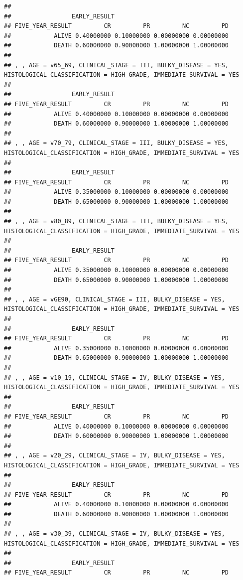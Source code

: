 \documentclass[]{article}
\begin{document}
\begin{verbatim}
## 
##                 EARLY_RESULT
## FIVE_YEAR_RESULT         CR         PR         NC         PD
##            ALIVE 0.40000000 0.10000000 0.00000000 0.00000000
##            DEATH 0.60000000 0.90000000 1.00000000 1.00000000
## 
## , , AGE = v65_69, CLINICAL_STAGE = III, BULKY_DISEASE = YES, HISTOLOGICAL_CLASSIFICATION = HIGH_GRADE, IMMEDIATE_SURVIVAL = YES
## 
##                 EARLY_RESULT
## FIVE_YEAR_RESULT         CR         PR         NC         PD
##            ALIVE 0.40000000 0.10000000 0.00000000 0.00000000
##            DEATH 0.60000000 0.90000000 1.00000000 1.00000000
## 
## , , AGE = v70_79, CLINICAL_STAGE = III, BULKY_DISEASE = YES, HISTOLOGICAL_CLASSIFICATION = HIGH_GRADE, IMMEDIATE_SURVIVAL = YES
## 
##                 EARLY_RESULT
## FIVE_YEAR_RESULT         CR         PR         NC         PD
##            ALIVE 0.35000000 0.10000000 0.00000000 0.00000000
##            DEATH 0.65000000 0.90000000 1.00000000 1.00000000
## 
## , , AGE = v80_89, CLINICAL_STAGE = III, BULKY_DISEASE = YES, HISTOLOGICAL_CLASSIFICATION = HIGH_GRADE, IMMEDIATE_SURVIVAL = YES
## 
##                 EARLY_RESULT
## FIVE_YEAR_RESULT         CR         PR         NC         PD
##            ALIVE 0.35000000 0.10000000 0.00000000 0.00000000
##            DEATH 0.65000000 0.90000000 1.00000000 1.00000000
## 
## , , AGE = vGE90, CLINICAL_STAGE = III, BULKY_DISEASE = YES, HISTOLOGICAL_CLASSIFICATION = HIGH_GRADE, IMMEDIATE_SURVIVAL = YES
## 
##                 EARLY_RESULT
## FIVE_YEAR_RESULT         CR         PR         NC         PD
##            ALIVE 0.35000000 0.10000000 0.00000000 0.00000000
##            DEATH 0.65000000 0.90000000 1.00000000 1.00000000
## 
## , , AGE = v10_19, CLINICAL_STAGE = IV, BULKY_DISEASE = YES, HISTOLOGICAL_CLASSIFICATION = HIGH_GRADE, IMMEDIATE_SURVIVAL = YES
## 
##                 EARLY_RESULT
## FIVE_YEAR_RESULT         CR         PR         NC         PD
##            ALIVE 0.40000000 0.10000000 0.00000000 0.00000000
##            DEATH 0.60000000 0.90000000 1.00000000 1.00000000
## 
## , , AGE = v20_29, CLINICAL_STAGE = IV, BULKY_DISEASE = YES, HISTOLOGICAL_CLASSIFICATION = HIGH_GRADE, IMMEDIATE_SURVIVAL = YES
## 
##                 EARLY_RESULT
## FIVE_YEAR_RESULT         CR         PR         NC         PD
##            ALIVE 0.40000000 0.10000000 0.00000000 0.00000000
##            DEATH 0.60000000 0.90000000 1.00000000 1.00000000
## 
## , , AGE = v30_39, CLINICAL_STAGE = IV, BULKY_DISEASE = YES, HISTOLOGICAL_CLASSIFICATION = HIGH_GRADE, IMMEDIATE_SURVIVAL = YES
## 
##                 EARLY_RESULT
## FIVE_YEAR_RESULT         CR         PR         NC         PD

\end{verbatim}
\end{document}
